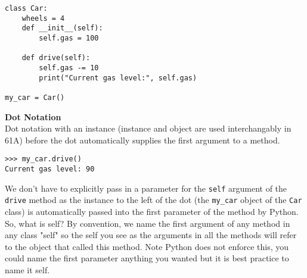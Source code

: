 \begin{lstlisting}
class Car:
    wheels = 4
    def __init__(self):
        self.gas = 100

    def drive(self):
        self.gas -= 10
        print("Current gas level:", self.gas)

my_car = Car()
\end{lstlisting}

\textbf{Dot Notation} \\
Dot notation with an instance (instance and object are used interchangably in 61A) before the dot automatically supplies the first argument to a method.
\begin{lstlisting}
>>> my_car.drive()
Current gas level: 90
\end{lstlisting}
\hfill \break
We don’t have to explicitly pass in a parameter for the \lstinline{self} argument of the \lstinline{drive} method as the instance to the left of the dot (the \lstinline{my_car} object of the \lstinline{Car} class) is automatically passed into the first parameter of the method by Python. So, what is self? By convention, we name the first argument of any method in any class "self" so the self you see as the arguments in all the methods will refer to the object that called this method. Note Python does not enforce this, you could name the first parameter anything you wanted but it is best practice to name it self. \\

